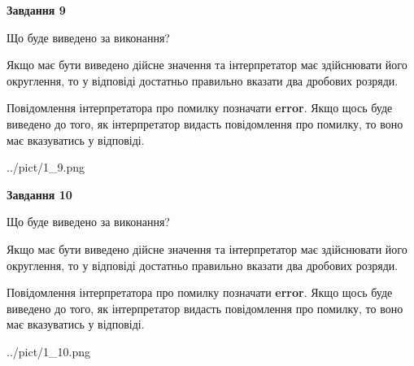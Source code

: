 \documentclass[12pt, ukrainian]{article}
\begin{document}
{\begin {Large}
{\begin {center}\textbf{Завдання 9}\end {center}}\par
Що буде виведено за виконання? \par

Якщо має бути виведено дійсне значення та інтерпретатор має здійснювати його округлення, 
то у відповіді достатньо правильно вказати два дробових розряди.

Повідомлення інтерпретатора про помилку позначати \textbf{error}.
Якщо щось буде виведено до того, як інтерпретатор видасть повідомлення про помилку, 
то воно має вказуватись у відповіді. \par

\begin{center}
	{../pict/1_9.png}
\end{center}
\newpage

{\begin {center}\textbf{Завдання 10}\end {center}}\par
Що буде виведено за виконання? \par

Якщо має бути виведено дійсне значення та інтерпретатор має здійснювати його округлення, 
то у відповіді достатньо правильно вказати два дробових розряди.

Повідомлення інтерпретатора про помилку позначати \textbf{error}.
Якщо щось буде виведено до того, як інтерпретатор видасть повідомлення про помилку, 
то воно має вказуватись у відповіді. \par

\begin{center}
	{../pict/1_10.png}
\end{center}
\newpage

\end {Large}}
\end{document}
